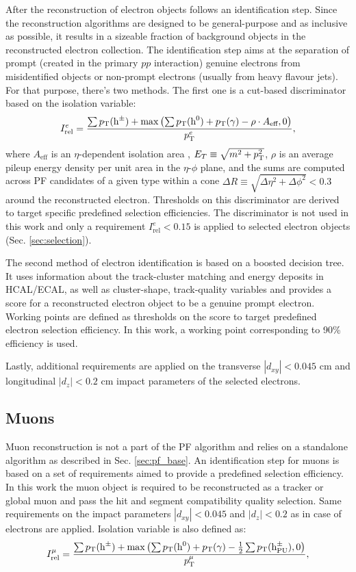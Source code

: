 After the reconstruction of electron objects follows an identification step. Since the reconstruction algorithms are designed to be general-purpose and as inclusive as possible, it results in a sizeable fraction of background objects in the reconstructed electron collection. The identification step aims at the separation of prompt (created in the primary $pp$ interaction) genuine electrons from misidentified objects or non-prompt electrons (usually from heavy flavour jets). For that purpose, there's two methods. The first one is a cut-based discriminator based on the isolation variable:
\begin{equation}\label{eq:iso_e}
    I^e_{\text{rel}} = \dfrac{\sum p_{\text{T}}(\text{h}^\pm) + \max\left(\sum p_{\text{T}}(\text{h}^0) + p_{\text{T}}(\gamma) - \rho \cdot A_\text{eff}, 0\right)}{p_{\text{T}}^e},
\end{equation}
where $A_\text{eff}$ is an $\eta$-dependent isolation area \cite{CMS:2015xaf}, $E_T \equiv \sqrt{m^2 + p_{\text{T}}^2}$, $\rho$ is an average pileup energy density per unit area in the $\eta$-$\phi$ plane, and the sums are computed across PF candidates of a given type within a cone $\Delta R \equiv \sqrt{\Delta\eta^2+\Delta\phi^2}< 0.3$ around the reconstructed electron. Thresholds on this discriminator are derived to target specific predefined selection efficiencies. The discriminator is not used in this work and only a requirement $I^e_{\text{rel}} < 0.15$ is applied to selected electron objects (Sec. \ref{sec:selection}). 

The second method of electron identification is based on a boosted decision tree. It uses information about the track-cluster matching and energy deposits in HCAL/ECAL, as well as cluster-shape, track-quality variables and provides a score for a reconstructed electron object to be a genuine prompt electron. Working points are defined as thresholds on the score to target predefined electron selection efficiency. In this work, a working point corresponding to 90\% efficiency is used.

Lastly, additional requirements are applied on the transverse $|d_{xy}| < 0.045$ cm and longitudinal $|d_z| < 0.2$ cm impact parameters of the selected electrons.

\subsection{Muons}\label{sec:reco_mu}
Muon reconstruction is not a part of the PF algorithm and relies on a standalone algorithm as described in Sec. \ref{sec:pf_base}. An identification step for muons is based on a set of requirements aimed to provide a predefined selection efficiency. In this work the muon object is required to be reconstructed as a tracker or global muon and pass the hit and segment compatibility quality selection. Same requirements on the impact parameters $|d_{xy}| < 0.045$ and $|d_z| < 0.2$ as in case of electrons are applied. Isolation variable is also defined as:
\begin{equation}\label{eq:iso_mu}
    I^\mu_{\text{rel}} = \dfrac{\sum p_{\text{T}}(\text{h}^\pm) + \max\left(\sum p_{\text{T}}(\text{h}^0) + p_{\text{T}}(\gamma) - \frac{1}{2}\sum p_{\text{T}}(\text{h}^\pm_{\text{PU}}), 0\right)}{p_{\text{T}}^\mu},
\end{equation}

